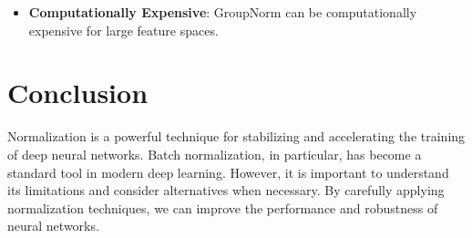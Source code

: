 \begin{notechapter}
\begin{itemize}
    \item \textbf{Computationally Expensive}:
    GroupNorm can be computationally expensive for large feature spaces.
\end{itemize}

\section{Conclusion}
Normalization is a powerful technique for stabilizing and accelerating
the training of deep neural networks. Batch normalization, in
particular, has become a standard tool in modern deep learning.
However, it is important to understand its limitations and consider
alternatives when necessary. By carefully applying normalization
techniques, we can improve the performance and robustness of neural
networks.
\end{notechapter}
